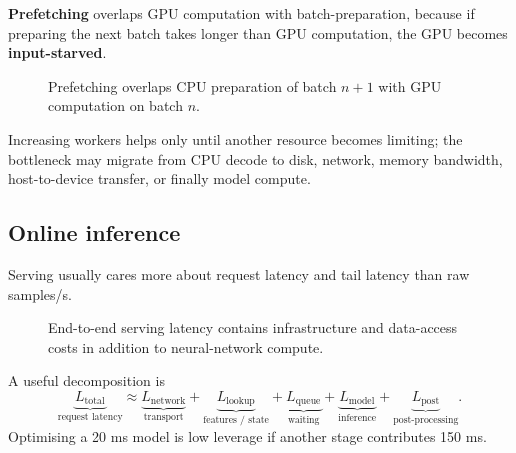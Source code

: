 \textbf{Prefetching} overlaps GPU computation with batch-preparation, because if preparing the next batch takes longer than GPU computation, the GPU becomes \textbf{input-starved}.

\begin{figure}[htbp]
\centering
{}
\caption{Prefetching overlaps CPU preparation of batch \(n+1\) with GPU computation on batch \(n\).}
\label{fig:prefetching-overlap}
\end{figure}

Increasing workers helps only until another resource becomes limiting; the bottleneck may migrate from CPU decode to disk, network, memory bandwidth, host-to-device transfer, or finally model compute.

\subsection{Online inference}
Serving usually cares more about request latency and tail latency than raw samples/s.

\begin{figure}[htbp]
\centering
{}
\caption{End-to-end serving latency contains infrastructure and data-access costs in addition to neural-network compute.}
\label{fig:inference-request-path}
\end{figure}

A useful decomposition is
\[
\underbrace{L_{\text{total}}}_{\text{request latency}}
\approx
\underbrace{L_{\text{network}}}_{\text{transport}}
+
\underbrace{L_{\text{lookup}}}_{\text{features / state}}
+
\underbrace{L_{\text{queue}}}_{\text{waiting}}
+
\underbrace{L_{\text{model}}}_{\text{inference}}
+
\underbrace{L_{\text{post}}}_{\text{post-processing}}.
\]
Optimising a 20 ms model is low leverage if another stage contributes 150 ms.

